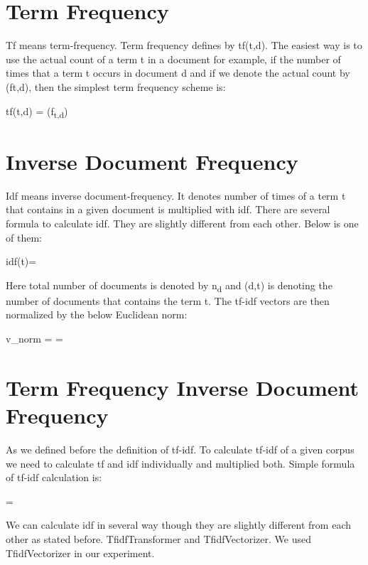 \documentclass{standalone}
\begin{document}
\section{Term Frequency}

Tf means term-frequency. Term frequency defines by tf(t,d). The easiest way is to use the actual count of a term t in a document for example, if the number of times that a term t occurs in document d and if we denote the actual count by (ft,d), then the simplest term frequency scheme is: 

\begin{center}
	\makebox  tf(t,d) = (f\textsubscript{t,d}) \\
\end{center}

\section{Inverse Document Frequency}
Idf means inverse document-frequency. It denotes number of times of a term t that contains in a given document is multiplied with idf. There are several formula to calculate idf. They are slightly different from each other. Below is one of them:  

\begin{center}
	\makebox  idf(t)=\log {} \\
\end{center}


Here total number of documents is denoted by n\textsubscript{d} and (d,t) is denoting the number of documents that contains the term t. The tf-idf vectors are then normalized by the below Euclidean norm:

\begin{center}
	\makebox  v_{norm} =  =  \\
\end{center}
\section{Term Frequency Inverse Document Frequency}
As we defined before the definition of tf-idf. To calculate tf-idf of a given corpus we need to calculate tf and idf individually and multiplied both. Simple formula of tf-idf calculation is: 

\begin{center}
	\makebox  {}= \times {} \\
\end{center}


We can calculate idf in several way though they are slightly different from each other as stated before.
TfidfTransformer and TfidfVectorizer. We used TfidfVectorizer in our experiment.

\end{document}
